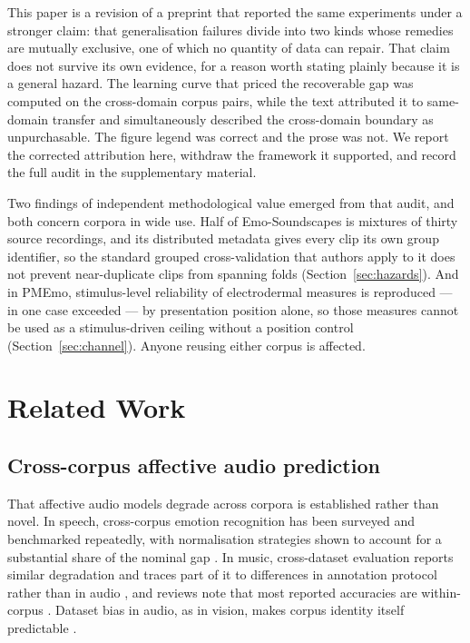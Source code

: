 This paper is a revision of a preprint \cite{zhang2026preprint} that reported
the same experiments under a stronger claim: that generalisation failures
divide into two kinds whose remedies are mutually exclusive, one of which no
quantity of data can repair. That claim does not survive its own evidence, for a reason worth
stating plainly because it is a general hazard. The learning curve that
priced the recoverable gap was computed on the cross-domain corpus pairs,
while the text attributed it to same-domain transfer and simultaneously
described the cross-domain boundary as unpurchasable. The figure legend was
correct and the prose was not. We report the corrected attribution here,
withdraw the framework it supported, and record the full audit in the
supplementary material.

Two findings of independent methodological value emerged from that audit, and
both concern corpora in wide use. Half of Emo-Soundscapes is mixtures of
thirty source recordings, and its distributed metadata gives every clip its
own group identifier, so the standard grouped cross-validation that authors
apply to it does not prevent near-duplicate clips from spanning folds
(Section~\ref{sec:hazards}). And in PMEmo, stimulus-level reliability of
electrodermal measures is reproduced --- in one case exceeded --- by
presentation position alone, so those measures cannot be used as a
stimulus-driven ceiling without a position control
(Section~\ref{sec:channel}). Anyone reusing either corpus is affected.

\section{Related Work}
\label{sec:related}

\subsection{Cross-corpus affective audio prediction}

That affective audio models degrade across corpora is established rather than
novel. In speech, cross-corpus emotion recognition has been surveyed and
benchmarked repeatedly, with normalisation strategies shown to account for a
substantial share of the nominal gap \cite{schuller2010crosscorpus,
zhang2019crosscorpus}. In music, cross-dataset evaluation reports similar
degradation and traces part of it to differences in annotation protocol rather
than in audio \cite{hu2017crossdataset}, and reviews note that most reported
accuracies are within-corpus \cite{yang2012machine, panda2023review}. Dataset
bias in audio, as in vision, makes corpus identity itself predictable
\cite{torralba2011unbiased}.

